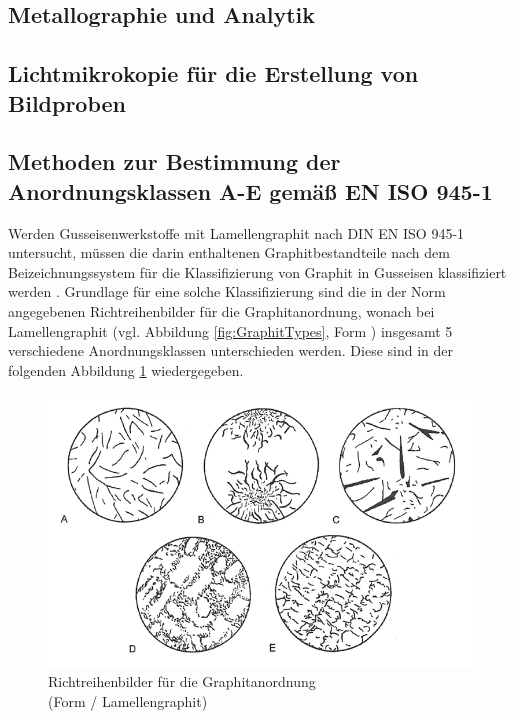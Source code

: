 \documentclass[
fontsize=10pt, 
listof = totoc,
parskip = half	
]{report}
\newcommand{\uproman}[1]{\uppercase\expandafter{\romannumeral#1}}
\begin{document}
\subsection{Metallographie und Analytik}
\label{sec:MetallographieAnalytik}

\subsection{Lichtmikrokopie für die Erstellung von Bildproben}
\label{subsec:Lichtmikroskopie}

\subsection{Methoden zur Bestimmung der Anordnungsklassen A-E gemäß EN ISO 945-1}
\label{subsec:MethodenBestAnordnungsklassen}
Werden Gusseisenwerkstoffe mit Lamellengraphit nach DIN EN ISO 945-1 untersucht, müssen die darin enthaltenen Graphitbestandteile nach dem Beizeichnungssystem für die Klassifizierung von Graphit in Gusseisen klassifiziert  werden \cite[Seite 6]{ISO945}. Grundlage für eine solche Klassifizierung sind die in der Norm angegebenen Richtreihenbilder für die Graphitanordnung, wonach bei Lamellengraphit (vgl. Abbildung \ref{fig:GraphitTypes}, Form \uproman{1}) insgesamt 5 verschiedene Anordnungsklassen unterschieden werden. Diese sind in der folgenden Abbildung \ref{fig:Anordnungsklassen} wiedergegeben.

\begin{figure}[H]
	\centering
	\includegraphics[scale=0.6]{pics/Anordnungsklassen}
	\caption{Richtreihenbilder für die Graphitanordnung\\ (Form \uproman{1} / Lamellengraphit) \cite[S.8]{ISO945}}
	\label{fig:Anordnungsklassen}
\end{figure}
\end{document}
